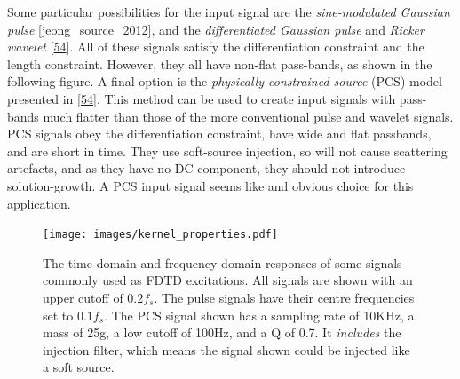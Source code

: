 \documentclass[]{scrreprt}
\begin{document}
Some particular possibilities for the input signal are the
\emph{sine-modulated Gaussian pulse} {[}jeong\_source\_2012{]}, and the
\emph{differentiated Gaussian pulse} and \emph{Ricker wavelet}
{[}\protect\hyperlink{ref-sheafferux5fphysicalux5f2014}{54}{]}. All of
these signals satisfy the differentiation constraint and the length
constraint. However, they all have non-flat pass-bands, as shown in the
following figure\text{
(\ref{fig:input_signal_info})}. A final option is the \emph{physically
constrained source} (PCS) model presented in
{[}\protect\hyperlink{ref-sheafferux5fphysicalux5f2014}{54}{]}. This
method can be used to create input signals with pass-bands much flatter
than those of the more conventional pulse and wavelet signals. PCS
signals obey the differentiation constraint, have wide and flat
passbands, and are short in time. They use soft-source injection, so
will not cause scattering artefacts, and as they have no DC component,
they should not introduce solution-growth. A PCS input signal seems like
and obvious choice for this application.

\begin{figure}[htbp]
\centering
\texttt{[image: images/kernel\_properties.pdf]}
\caption{The time-domain and frequency-domain responses of some signals
commonly used as FDTD excitations. All signals are shown with an upper
cutoff of \(0.2f_s\). The pulse signals have their centre frequencies
set to \(0.1f_s\). The PCS signal shown has a sampling rate of 10KHz, a
mass of 25g, a low cutoff of 100Hz, and a Q of 0.7. It \emph{includes}
the injection filter, which means the signal shown could be injected
like a soft source. \label{fig:input_signal_info}}
\end{figure}
\end{document}
